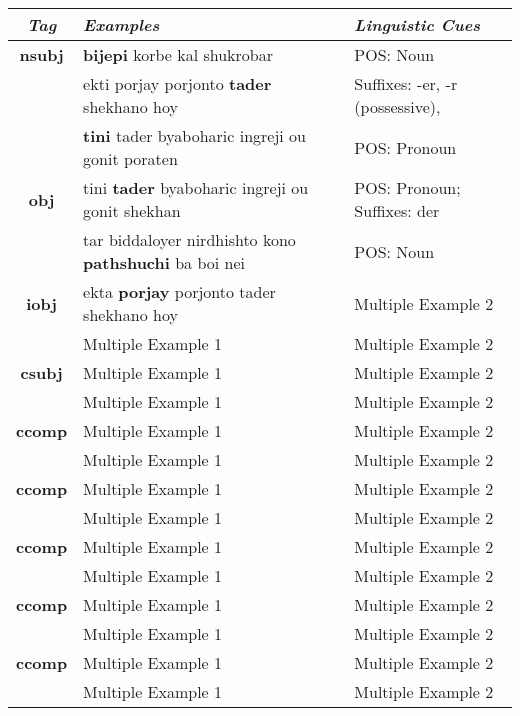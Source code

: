 \documentclass[a4 paper]{article}
\begin{document}
\begin{longtable}{cp{}p{}}
    \toprule
    \textit{Tag} & \textit{Examples} & \textit{Linguistic Cues} \\ 
    \toprule
    \addlinespace[0.5em]
    \textbf{nsubj}
                 & \textbf{bijepi} korbe kal shukrobar
                 & POS: Noun\\
    \addlinespace[0.5em]
                 & ekti porjay porjonto \textbf{tader} shekhano hoy
                 & Suffixes: -er, -r (possessive), \\
    \addlinespace[0.5em]
                 & \textbf{tini} tader byaboharic ingreji ou gonit poraten
                 & POS: Pronoun\\
    \midrule
    \addlinespace[0.5em]
    \textbf{obj}
                 & tini \textbf{tader} byaboharic ingreji ou gonit shekhan
                 & POS: Pronoun; Suffixes: der\\
    \addlinespace[0.5em]
                 & tar biddaloyer nirdhishto kono \textbf{pathshuchi} ba boi nei
                 & POS: Noun \\
    \midrule
    \addlinespace[0.5em]
    \textbf{iobj}
                 & ekta \textbf{porjay} porjonto tader shekhano hoy
                 & Multiple Example 2\\
    \addlinespace[0.5em]
                 & Multiple Example 1 
                 & Multiple Example 2\\
    \midrule
    \addlinespace[0.5em]
    \textbf{csubj}
                 & Multiple Example 1 & Multiple Example 2\\
    \addlinespace[0.5em]
                 & Multiple Example 1 & Multiple Example 2\\
    \midrule
    \addlinespace[0.5em]
    \textbf{ccomp}
                 & Multiple Example 1 & Multiple Example 2\\
    \addlinespace[0.5em]
                 & Multiple Example 1 & Multiple Example 2\\
    \midrule
    \addlinespace[0.5em]
    \textbf{ccomp}
                 & Multiple Example 1 & Multiple Example 2\\
    \addlinespace[0.5em]
                 & Multiple Example 1 & Multiple Example 2\\
    \midrule
    \addlinespace[0.5em]
    \textbf{ccomp}
                 & Multiple Example 1 & Multiple Example 2\\
    \addlinespace[0.5em]
                 & Multiple Example 1 & Multiple Example 2\\
    \midrule
    \addlinespace[0.5em]
    \textbf{ccomp}
                 & Multiple Example 1 & Multiple Example 2\\
    \addlinespace[0.5em]
                 & Multiple Example 1 & Multiple Example 2\\
    \midrule
    \addlinespace[0.5em]
    \textbf{ccomp}
                 & Multiple Example 1 & Multiple Example 2\\
    \addlinespace[0.5em]
                 & Multiple Example 1 & Multiple Example 2\\
    \midrule
    

\end{longtable}
\end{document}

